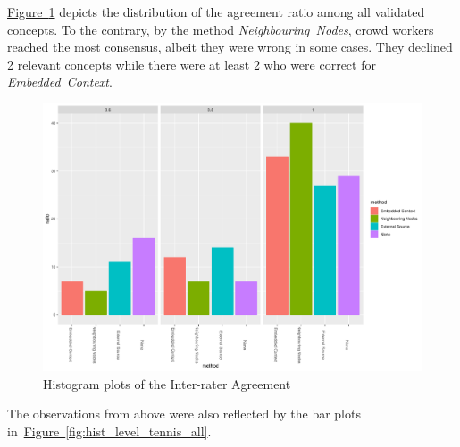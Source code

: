 \hyperref[fig:hist_agreement_tennis_all]{Figure~\ref*{fig:hist_agreement_tennis_all}} depicts the distribution of the agreement ratio among all validated concepts. To the contrary, by the method \emph{Neighbouring~Nodes}, crowd workers reached the most consensus, albeit they were wrong in some cases. They declined 2 relevant concepts while there were at least 2 who were correct for \emph{Embedded~Context}. 
\begin{figure}
  	 \includegraphics[width=\textwidth]{plots/tennis/hist_agreement}
  	 \caption{Histogram plots of the Inter-rater Agreement}\label{fig:hist_agreement_tennis_all}
\end{figure}


The observations from above were also reflected by the bar plots in~\hyperref[fig:hist_level_tennis_all]{Figure~\ref*{fig:hist_level_tennis_all}}. 

